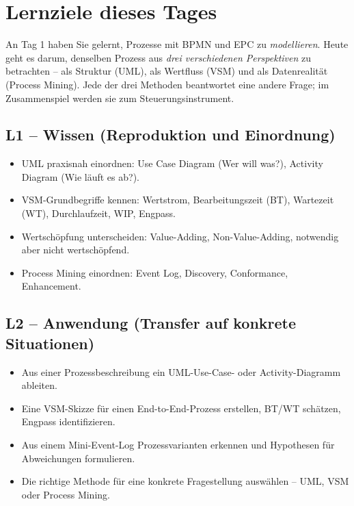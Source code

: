 \documentclass[11pt,a4paper,oneside]{article}
\begin{document}
\section*{Lernziele dieses Tages}
\thispagestyle{plain}

\noindent An Tag 1 haben Sie gelernt, Prozesse mit BPMN und EPC zu \emph{modellieren}. Heute geht es darum, denselben Prozess aus \emph{drei verschiedenen Perspektiven} zu betrachten -- als Struktur (UML), als Wertfluss (VSM) und als Datenrealität (Process Mining). Jede der drei Methoden beantwortet eine andere Frage; im Zusammenspiel werden sie zum Steuerungsinstrument.

\subsection*{L1 -- Wissen (Reproduktion und Einordnung)}
\begin{itemize}
  \item UML praxisnah einordnen: Use Case Diagram (Wer will was?), Activity Diagram (Wie läuft es ab?).
  \item VSM-Grundbegriffe kennen: Wertstrom, Bearbeitungszeit (BT), Wartezeit (WT), Durchlaufzeit, WIP, Engpass.
  \item Wertschöpfung unterscheiden: Value-Adding, Non-Value-Adding, notwendig aber nicht wertschöpfend.
  \item Process Mining einordnen: Event Log, Discovery, Conformance, Enhancement.
\end{itemize}

\subsection*{L2 -- Anwendung (Transfer auf konkrete Situationen)}
\begin{itemize}
  \item Aus einer Prozessbeschreibung ein UML-Use-Case- oder Activity-Diagramm ableiten.
  \item Eine VSM-Skizze für einen End-to-End-Prozess erstellen, BT/WT schätzen, Engpass identifizieren.
  \item Aus einem Mini-Event-Log Prozessvarianten erkennen und Hypothesen für Abweichungen formulieren.
  \item Die richtige Methode für eine konkrete Fragestellung auswählen -- UML, VSM oder Process Mining.
\end{itemize}
\end{document}
